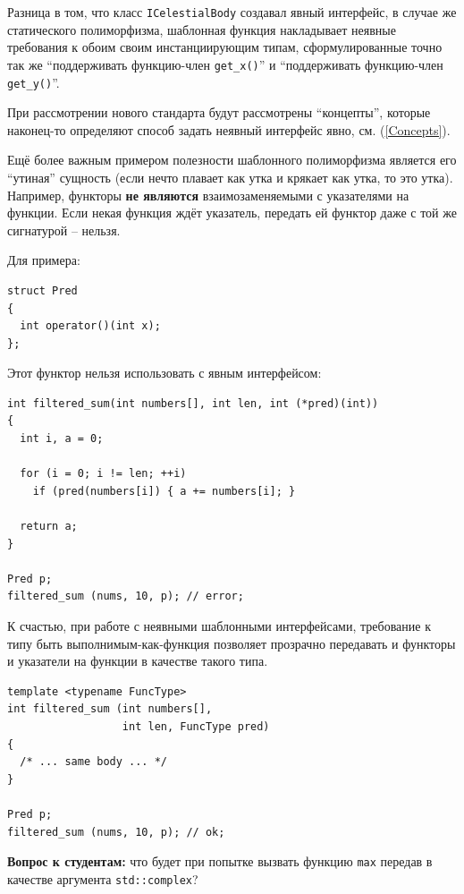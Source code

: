 \documentclass[a4paper,12pt,oneside]{book}
\newif\ifanswers
\begin{document}
Разница в том, что класс \lstinline!ICelestialBody! создавал явный интерфейс, в случае же статического полиморфизма, шаблонная функция накладывает неявные требования к обоим своим инстанциирующим типам, сформулированные точно так же ``поддерживать функцию-член \lstinline!get_x()!'' и ``поддерживать функцию-член \lstinline!get_y()!''. 

При рассмотрении нового стандарта будут рассмотрены ``концепты'', которые наконец-то определяют способ задать неявный интерфейс явно, см. (\ref{Concepts}).

Ещё более важным примером полезности шаблонного полиморфизма является его ``утиная'' сущность (если нечто плавает как утка и крякает как утка, то это утка). Например, функторы \textbf{не являются} взаимозаменяемыми с указателями на функции. Если некая функция ждёт указатель, передать ей функтор даже с той же сигнатурой -- нельзя. 

Для примера:

\begin{lstlisting}
struct Pred 
{
  int operator()(int x);
};
\end{lstlisting}

Этот функтор нельзя использовать с явным интерфейсом:

\begin{lstlisting}
int filtered_sum(int numbers[], int len, int (*pred)(int))
{
  int i, a = 0;

  for (i = 0; i != len; ++i)
    if (pred(numbers[i]) { a += numbers[i]; }

  return a;
}

Pred p;
filtered_sum (nums, 10, p); // error;
\end{lstlisting}

К счастью, при работе с неявными шаблонными интерфейсами, требование к типу быть выполнимым-как-функция позволяет прозрачно передавать и функторы и указатели на функции в качестве такого типа.
 
\begin{lstlisting}
template <typename FuncType>
int filtered_sum (int numbers[], 
                  int len, FuncType pred) 
{ 
  /* ... same body ... */ 
}

Pred p;
filtered_sum (nums, 10, p); // ok;
\end{lstlisting}

\textbf{Вопрос к студентам:} что будет при попытке вызвать функцию \lstinline!max! передав в качестве аргумента \lstinline!std::complex!?

\ifanswers
Правильный ответ: увы, на комплексных числах нельзя ввести ни порядка ни даже частичного порядка. Будет ошибка компиляции.
\fi
\end{document}
